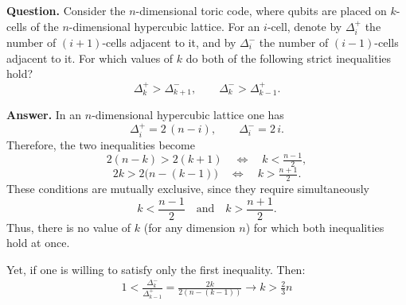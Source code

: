 \documentclass[manuscript,screen,review]{acmart}
\begin{document}
%
%
%
%
\textbf{Question.}  
Consider the $n$-dimensional toric code, where qubits are placed on $k$-cells of the $n$-dimensional hypercubic lattice.  
For an $i$-cell, denote by $\Delta_i^{+}$ the number of $(i{+}1)$-cells adjacent to it, and by $\Delta_i^{-}$ the number of $(i{-}1)$-cells adjacent to it.  
For which values of $k$ do both of the following strict inequalities hold?
\[
\Delta_k^{+} > \Delta_{k+1}^{-}, \qquad \Delta_k^{-} > \Delta_{k-1}^{+}.
\]

\textbf{Answer.}  
In an $n$-dimensional hypercubic lattice one has
\[
\Delta_i^{+} = 2\,(n-i), \qquad \Delta_i^{-} = 2\,i.
\]
Therefore, the two inequalities become
\[
2(n-k) > 2(k+1) \quad\iff\quad k < \tfrac{n-1}{2},
\]
\[
2k > 2\bigl(n-(k-1)\bigr) \quad\iff\quad k > \tfrac{n+1}{2}.
\]
These conditions are mutually exclusive, since they require simultaneously
\[
k < \frac{n-1}{2} \quad \text{and} \quad k > \frac{n+1}{2}.
\]
Thus, there is no value of $k$ (for any dimension $n$) for which both inequalities hold at once.  


Yet, if one is willing to satisfy only the first inequality. Then: 
\begin{equation*}
  \begin{split}
    1 < \frac{\Delta_{k}^{-}}{\Delta_{k-1}^{+}} = \frac{2k}{2(n-(k-1))} \rightarrow k > \frac{2}{3}n
  \end{split}
\end{equation*}
\end{document}
